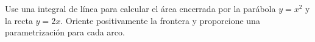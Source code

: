 Use una integral de línea para calcular el área encerrada por la parábola $y=x^2$ y la recta $y=2x$. Oriente positivamente la frontera y proporcione una parametrización para cada arco.
